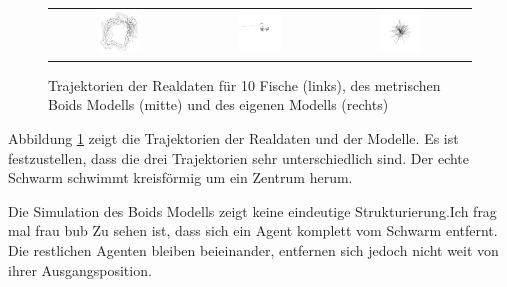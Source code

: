 \begin{figure}[H]
\centering
\begin{tabular}{ccc}
\includegraphics[width=0.33\textwidth]{figures/Experimente/Realdaten/Boids_10_Fisch_real.png} &
\includegraphics[width=0.33\textwidth]{figures/Experimente/Realdaten/Boids_10_Fisch.png} &
\includegraphics[width=0.33\textwidth]{figures/Experimente/Realdaten/PWD_10_Fisch.png} 
\end{tabular}
\caption{Trajektorien der Realdaten für 10 Fische (links), des metrischen Boids Modells (mitte) und des eigenen Modells (rechts)\label{fig:10Fisch}}
\end{figure}

Abbildung \ref{fig:10Fisch} zeigt die Trajektorien der Realdaten und der Modelle. Es ist festzustellen, dass die drei Trajektorien sehr unterschiedlich sind. Der echte Schwarm schwimmt kreisförmig um ein Zentrum herum. 

Die Simulation des Boids Modells zeigt keine eindeutige Strukturierung.Ich frag mal frau bub Zu sehen ist, dass sich ein Agent komplett vom Schwarm entfernt. Die restlichen Agenten bleiben beieinander, entfernen sich jedoch nicht weit von ihrer Ausgangsposition.

